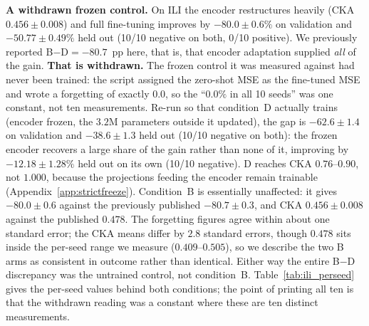 \textbf{A withdrawn frozen control.}
On ILI the encoder restructures heavily (CKA $0.456{\pm}0.008$) and full
fine-tuning improves by $-80.0{\pm}0.6\%$ on validation and
$-50.77{\pm}0.49\%$ held out (10/10 negative on both, 0/10 positive).
We previously reported
B${-}$D${=}{-}80.7$~pp here, that is, that encoder adaptation supplied
\emph{all} of the gain. \textbf{That is withdrawn.} The frozen control it was
measured against had never been trained: the script assigned the zero-shot MSE
as the fine-tuned MSE and wrote a forgetting of exactly $0.0$, so the
``$0.0\%$ in all 10 seeds'' was one constant, not ten measurements. Re-run so
that condition~D actually trains (encoder frozen, the $3.2$M parameters
outside it updated), the gap is $-62.6{\pm}1.4$ on validation and
$-38.6{\pm}1.3$ held out (10/10 negative on both): the frozen encoder recovers
a large share of the gain rather than none of it, improving by
$-12.18{\pm}1.28\%$ held out on its own (10/10 negative).
D reaches CKA $0.76$--$0.90$,
not $1.000$, because the projections feeding the encoder remain trainable
(Appendix~\ref{app:strictfreeze}). Condition~B is essentially unaffected: it
gives $-80.0{\pm}0.6$ against the previously published $-80.7{\pm}0.3$, and CKA
$0.456{\pm}0.008$ against the published $0.478$. The forgetting figures agree
within about one standard error; the CKA means differ by $2.8$ standard errors,
though $0.478$ sits inside the per-seed range we measure ($0.409$--$0.505$), so
we describe the two B arms as consistent in outcome rather than identical. Either
way the entire B${-}$D discrepancy was the untrained control, not condition~B.
Table~\ref{tab:ili_perseed} gives the per-seed values behind both conditions;
the point of printing all ten is that the withdrawn reading was a constant
where these are ten distinct measurements.


